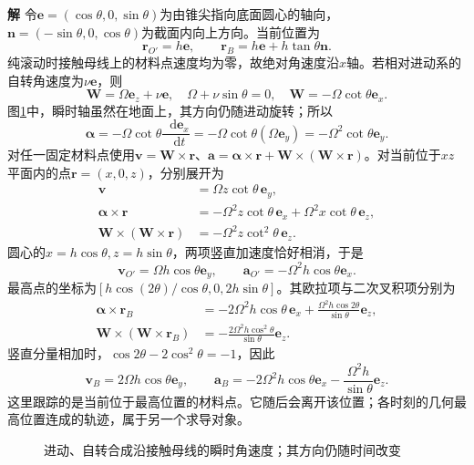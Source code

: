 \documentclass[11pt,openany,fontset=fandol]{ctexbook}
\theoremstyle{definition}\newtheorem{example}{例}[chapter]\newtheorem{exercise}{习题}[chapter]
\newcommand{\SolutionStart}{\par\medskip\ifdim\pagetotal>0pt\ifdim\dimexpr\pagegoal-\pagetotal\relax<3\baselineskip\newpage\fi\fi\noindent\textbf{解}\quad\ignorespaces}
\newenvironment{solution}{\SolutionStart}{\par\medskip}
\newcommand{\dd}{\mathop{}\!\mathrm d}\newcommand{\ee}{\mathrm e}\newcommand{\vct}[1]{\bm{#1}}
\begin{document}
\begin{solution}
令$\vct e=(\cos\theta,0,\sin\theta)$为由锥尖指向底面圆心的轴向，$\vct n=(-\sin\theta,0,\cos\theta)$为截面内向上方向。当前位置为
\[
 \vct r_{O'}=h\vct e,\qquad
 \vct r_B=h\vct e+h\tan\theta\vct n.
\]
纯滚动时接触母线上的材料点速度均为零，故绝对角速度沿$x$轴。若相对进动系的自转角速度为$\nu\vct e$，则
\[
 \vct W=\Omega\vct e_z+\nu\vct e,
 \quad\Omega+\nu\sin\theta=0,
 \quad\boxed{\vct W=-\Omega\cot\theta\vct e_x}.
\]
图\ref{mp3:fig:hw:l3-22-s}中，瞬时轴虽然在地面上，其方向仍随进动旋转；所以
\[
 \vct\alpha=-\Omega\cot\theta\frac{\dd\vct e_x}{\dd t}
 =-\Omega\cot\theta(\Omega\vct e_y)
 =-\Omega^2\cot\theta\vct e_y.
\]
对任一固定材料点使用$\vct v=\vct W\times\vct r$、$\vct a=\vct\alpha\times\vct r+\vct W\times(\vct W\times\vct r)$。对当前位于$xz$平面内的点$\vct r=(x,0,z)$，分别展开为
\[
\begin{aligned}
\vct v&=\Omega z\cot\theta\,\vct e_y,\\
\vct\alpha\times\vct r
&=-\Omega^2z\cot\theta\,\vct e_x
+\Omega^2x\cot\theta\,\vct e_z,\\
\vct W\times(\vct W\times\vct r)
&=-\Omega^2z\cot^2\theta\,\vct e_z.
\end{aligned}
\]
圆心的$x=h\cos\theta,z=h\sin\theta$，两项竖直加速度恰好相消，于是
\[
 \boxed{\vct v_{O'}=\Omega h\cos\theta\vct e_y,
 \qquad\vct a_{O'}=-\Omega^2h\cos\theta\vct e_x}.
\]
最高点的坐标为$[h\cos(2\theta)/\cos\theta,0,2h\sin\theta]$。其欧拉项与二次叉积项分别为
\[
\begin{aligned}
\vct\alpha\times\vct r_B
&=-2\Omega^2h\cos\theta\,\vct e_x
+\frac{\Omega^2h\cos2\theta}{\sin\theta}\vct e_z,\\
\vct W\times(\vct W\times\vct r_B)
&=-\frac{2\Omega^2h\cos^2\theta}{\sin\theta}\vct e_z.
\end{aligned}
\]
竖直分量相加时，$\cos2\theta-2\cos^2\theta=-1$，因此
\[
 \boxed{\vct v_B=2\Omega h\cos\theta\vct e_y},\qquad
 \boxed{\vct a_B=-2\Omega^2h\cos\theta\vct e_x
                        -\frac{\Omega^2h}{\sin\theta}\vct e_z}.
\]
这里跟踪的是当前位于最高位置的材料点。它随后会离开该位置；各时刻的几何最高位置连成的轨迹，属于另一个求导对象。


\begin{figure}[H]\centering
{}
\caption{进动、自转合成沿接触母线的瞬时角速度；其方向仍随时间改变}\label{mp3:fig:hw:l3-22-s}
\end{figure}

\end{solution}
\end{document}
